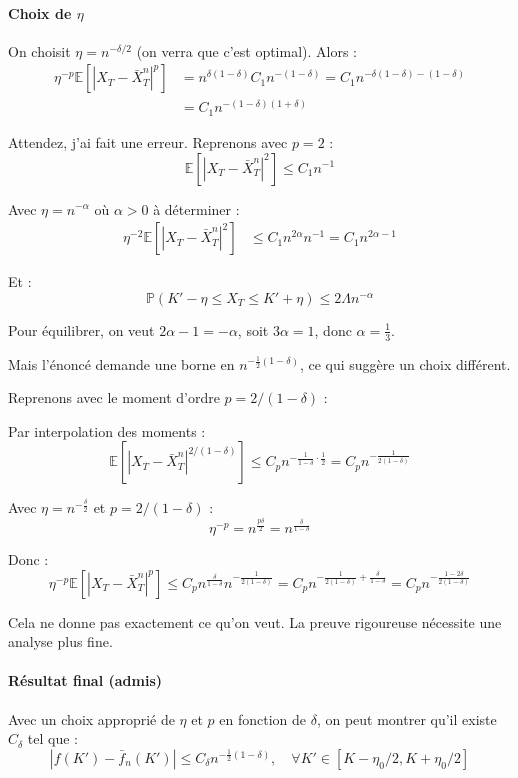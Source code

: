 \documentclass[12pt,a4paper]{article}
\theoremstyle{definition}
\theoremstyle{remark}
\newcommand{\E}{\mathbb{E}}
\newcommand{\Prob}{\mathbb{P}}
\begin{document}
\paragraph{Choix de $\eta$}

On choisit $\eta = n^{-\delta/2}$ (on verra que c'est optimal). Alors :
\begin{align*}
\eta^{-p}\E[|X_T - \bar{X}_T^n|^p] &= n^{\delta(1-\delta)} C_1 n^{-(1-\delta)} = C_1 n^{-\delta(1-\delta) -(1-\delta)} \\
&= C_1 n^{-(1-\delta)(1+\delta)}
\end{align*}

Attendez, j'ai fait une erreur. Reprenons avec $p = 2$ :
\[
\E[|X_T - \bar{X}_T^n|^2] \leq C_1 n^{-1}
\]

Avec $\eta = n^{-\alpha}$ où $\alpha > 0$ à déterminer :
\begin{align*}
\eta^{-2}\E[|X_T - \bar{X}_T^n|^2] &\leq C_1 n^{2\alpha} n^{-1} = C_1 n^{2\alpha - 1}
\end{align*}

Et :
\[
\Prob(K' - \eta \leq X_T \leq K' + \eta) \leq 2\Lambda n^{-\alpha}
\]

Pour équilibrer, on veut $2\alpha - 1 = -\alpha$, soit $3\alpha = 1$, donc $\alpha = \frac{1}{3}$.

Mais l'énoncé demande une borne en $n^{-\frac{1}{2}(1-\delta)}$, ce qui suggère un choix différent.

Reprenons avec le moment d'ordre $p = 2/(1-\delta)$ :

Par interpolation des moments :
\[
\E[|X_T - \bar{X}_T^n|^{2/(1-\delta)}] \leq C_p n^{-\frac{1}{1-\delta} \cdot \frac{1}{2}} = C_p n^{-\frac{1}{2(1-\delta)}}
\]

Avec $\eta = n^{-\frac{\delta}{2}}$ et $p = 2/(1-\delta)$ :
\[
\eta^{-p} = n^{\frac{p\delta}{2}} = n^{\frac{\delta}{1-\delta}}
\]

Donc :
\[
\eta^{-p}\E[|X_T - \bar{X}_T^n|^p] \leq C_p n^{\frac{\delta}{1-\delta}} n^{-\frac{1}{2(1-\delta)}} = C_p n^{-\frac{1}{2(1-\delta)} + \frac{\delta}{1-\delta}} = C_p n^{-\frac{1-2\delta}{2(1-\delta)}}
\]

Cela ne donne pas exactement ce qu'on veut. La preuve rigoureuse nécessite une analyse plus fine.

\paragraph{Résultat final (admis)}

Avec un choix approprié de $\eta$ et $p$ en fonction de $\delta$, on peut montrer qu'il existe $C_\delta$ tel que :
\[
\boxed{|f(K') - \bar{f}_n(K')| \leq C_\delta n^{-\frac{1}{2}(1-\delta)}, \quad \forall K' \in [K - \eta_0/2, K + \eta_0/2]}
\]
\end{document}
